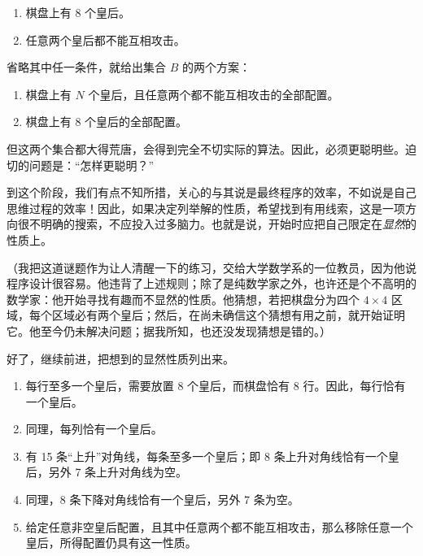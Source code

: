 \begin{enumerate}[wide, nosep, label=(\arabic*)]
	\item 棋盘上有 8 个皇后。
	\item 任意两个皇后都不能互相攻击。
\end{enumerate}

省略其中任一条件，就给出集合 $B$ 的两个方案：

\begin{enumerate}[leftmargin=*, itemindent=1.9em, label=B\arabic*:]
	\item \label{en:b1-eight-queens}
	棋盘上有 $N$ 个皇后，且任意两个都不能互相攻击的全部配置。
	\item \label{en:b2-eight-queens}
	棋盘上有 8 个皇后的全部配置。
\end{enumerate}

但这两个集合都大得荒唐，会得到完全不切实际的算法。因此，必须更聪明些。迫切的问题是：“怎样更聪明？”

到这个阶段，我们有点不知所措，关心的与其说是最终程序的效率，不如说是自己思维过程的效率！因此，如果决定列举解的性质，希望找到有用线索，这是一项方向很不明确的搜索，不应投入过多脑力。也就是说，开始时应把自己限定在\textit{显然}的性质上。

（我把这道谜题作为让人清醒一下的练习，交给大学数学系的一位教员，因为他说程序设计很容易。他违背了上述规则；除了是纯数学家之外，也许还是个不高明的数学家：他开始寻找有趣而不显然的性质。他猜想，若把棋盘分为四个 $4\times 4$ 区域，每个区域必有两个皇后；然后，在尚未确信这个猜想有用之前，就开始证明它。他至今仍未解决问题；据我所知，也还没发现猜想是错的。）

好了，继续前进，把想到的显然性质列出来。

\begin{enumerate}[wide, nosep, label=(\alph*)]
	\item \label{en:property-a}
	每行至多一个皇后，需要放置 8 个皇后，而棋盘恰有 8 行。因此，每行恰有一个皇后。
	\item 同理，每列恰有一个皇后。
	\item 有 15 条“上升”对角线，每条至多一个皇后；即 8 条上升对角线恰有一个皇后，另外 7 条上升对角线为空。
	\item 同理，8 条下降对角线恰有一个皇后，另外 7 条为空。
	\item 给定任意非空皇后配置，且其中任意两个都不能互相攻击，那么移除任意一个皇后，所得配置仍具有这一性质。
\end{enumerate}

